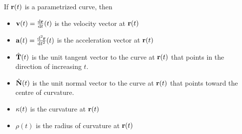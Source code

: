 \begin{notn}\label{notn:curveNotation}
If $\mathbf{r}(t)$ is a parametrized curve, then
\begin{itemize}
\item 
$\vv(t) = \diff{\vr}{t}(t)$ is the velocity vector at $\mathbf{r}(t)$

\item
$\va(t) = \difftwo{\vr}{t}(t) $ is the acceleration vector at $\mathbf{r}(t)$

\item
$\hat{\mathbf{T}}(t)$ is the unit tangent vector to the curve at $\mathbf{r}(t)$ that
points in the direction of increasing $t$.

\item
$\hat{\mathbf{N}}(t)$ is the unit normal vector to the curve at $\mathbf{r}(t)$
that points toward the centre of curvature.

\item
$\kappa(t)$ is the curvature at $\mathbf{r}(t)$

\item
$\rho(t)$ is the radius of curvature at $\mathbf{r}(t)$
\end{itemize}
\end{notn}

